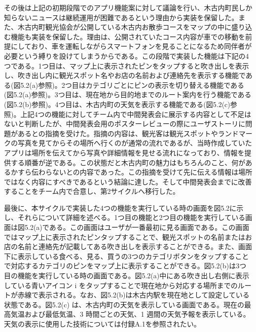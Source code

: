その後は上記の初期段階でのアプリ機能案に対して議論を行い、木古内町民しか知らないニュースは継続運用が困難であるという理由から実装を保留した。また、木古内町観光協会が公開している木古内お散歩コースをマップの中に盛り込む機能も実装を保留した。理由は、公開されていたコース内容が車での移動を前提にしており、車を運転しながらスマートフォンを見ることになるため同伴者が必要という縛りを設けてしまうからである。この段階で実装した機能は下記の4つである。1つ目は、マップ上に表示されたピンをタップすると吹き出しを表示し、吹き出し内に観光スポット名やお店の名前および連絡先を表示する機能である(図5.2(a)参照)。2つ目はカテゴリごとにピンの表示を切り替える機能である(図5.2(a)参照)。3つ目は、現在地から目的地までのルート案内を行う機能である(図5.2(b)参照)。4つ目は、木古内町の天気を表示する機能である(図5.2(c)参照)。上記4つの機能に対してチーム内で中間発表会に展示する内容として不足はないと判断したが、中間発表会用のポスターレビューの際にユーザストーリに問題があるとの指摘を受けた。指摘の内容は、観光客は観光スポットやランドマークの写真を見てからその場所へ行くのが通常の流れであるが、当時作成していたアプリは場所を伝えてから写真や詳細情報を見せる流れになっており、情報を提供する順番が逆である。この状態だと木古内町の魅力はもちろんのこと、何があるかすら伝わらないとの内容であった。この指摘を受けて先に伝える情報は場所ではなく内容にすべきであるという結論に達した。そして中間発表会までに改善することをチーム内で合意し、第2サイクルへ移行した。\par

最後に、本サイクルで実装した4つの機能を実行している時の画面を図5.2に示し、それらについて詳細を述べる。1つ目の機能と2つ目の機能を実行している画面は図5.2(a)である。この画面はユーザが一番最初に見る画面である。この画面ではマップ上に表示されたピンタップすることで、観光スポットの名前またはお店の名前と連絡先が記載してある吹き出しを表示することができる。また、画面下に表示している食べる、見る、買うの3つのカテゴリボタンをタップすることで対応するカテゴリのピンをマップ上に表示することができる。図5.2(b)は3つ目の機能を実行している時の画面である。図5.2(a)中にある吹き出し右側に表示している青いアイコン i をタップすることで現在地から対応する場所までのルートが赤線で表示される。なお、図5.2(b)は木古内駅を現在地として設定している状態である。図5.2(c) は、木古内町の天気を表示している画面である。現在の最高気温および最低気温、3 時間ごとの天気、1 週間の天気予報を表示している。天気の表示に使用した技術については付録A.1を参照されたい。


